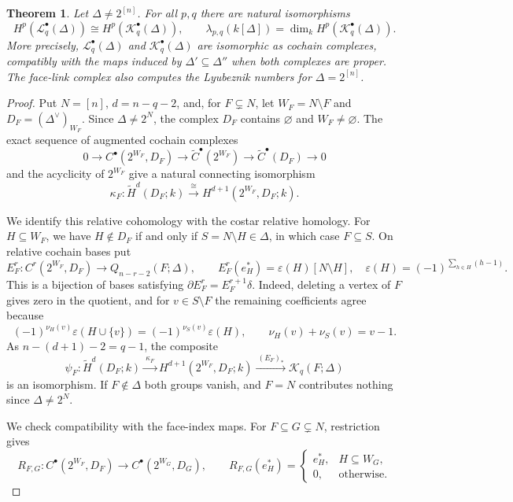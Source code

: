 \documentclass[11pt]{article}
\theoremstyle{plain}
\newtheorem{theorem}{Theorem}[section]
\theoremstyle{definition}
\newcommand{\kk}{k}
\newcommand{\rH}{\widetilde{H}}
\newcommand{\rC}{\widetilde{C}}
\newcommand{\Lc}{\mathcal L}
\newcommand{\Kc}{\mathcal K}
\begin{document}
\begin{theorem}\label{thm:link-model}
Let $\Delta\ne2^{[n]}$. For all $p,q$ there are natural isomorphisms
\[
H^p(\Lc_q^\bullet(\Delta))\cong H^p(\Kc_q^\bullet(\Delta)),\qquad
\lambda_{p,q}(\kk[\Delta])=\dim_\kk H^p(\Kc_q^\bullet(\Delta)).
\]
More precisely, $\Lc_q^\bullet(\Delta)$ and $\Kc_q^\bullet(\Delta)$ are isomorphic as cochain complexes, compatibly with the maps induced by $\Delta'\subseteq\Delta''$ when both complexes are proper. The face-link complex also computes the Lyubeznik numbers for $\Delta=2^{[n]}$.
\end{theorem}

\begin{proof}
Put $N=[n]$, $d=n-q-2$, and, for $F\subsetneq N$, let $W_F=N\setminus F$ and $D_F=(\Delta^\vee)_{W_F}$. Since $\Delta\ne2^N$, the complex $D_F$ contains $\varnothing$ and $W_F\ne\varnothing$. The exact sequence of augmented cochain complexes
\[
0\longrightarrow C^\bullet(2^{W_F},D_F)\longrightarrow\rC^\bullet(2^{W_F})\longrightarrow\rC^\bullet(D_F)\longrightarrow0
\]
and the acyclicity of $2^{W_F}$ give a natural connecting isomorphism
\[
\kappa_F:\rH^d(D_F;\kk)\xrightarrow{\ \cong\ }H^{d+1}(2^{W_F},D_F;\kk).
\]

We identify this relative cohomology with the costar relative homology. For $H\subseteq W_F$, we have $H\notin D_F$ if and only if $S=N\setminus H\in\Delta$, in which case $F\subseteq S$. On relative cochain bases put
\[
E_F^r:C^r(2^{W_F},D_F)\longrightarrow Q_{n-r-2}(F;\Delta),\qquad
E_F^r(e_H^*)=\varepsilon(H)[N\setminus H],\quad
\varepsilon(H)=(-1)^{\sum_{h\in H}(h-1)}.
\]
This is a bijection of bases satisfying $\partial E_F^r=E_F^{r+1}\delta$. Indeed, deleting a vertex of $F$ gives zero in the quotient, and for $v\in S\setminus F$ the remaining coefficients agree because
\[
(-1)^{\nu_H(v)}\varepsilon(H\cup\{v\})=(-1)^{\nu_S(v)}\varepsilon(H),\qquad
\nu_H(v)+\nu_S(v)=v-1.
\]
As $n-(d+1)-2=q-1$, the composite
\[
\psi_F:\rH^d(D_F;\kk)\xrightarrow{\ \kappa_F\ }H^{d+1}(2^{W_F},D_F;\kk)
\xrightarrow{\ (E_F)_*\ }\Kc_q(F;\Delta)
\]
is an isomorphism. If $F\notin\Delta$ both groups vanish, and $F=N$ contributes nothing since $\Delta\ne2^N$.

We check compatibility with the face-index maps. For $F\subseteq G\subsetneq N$, restriction gives
\[
R_{F,G}:C^\bullet(2^{W_F},D_F)\longrightarrow C^\bullet(2^{W_G},D_G),\qquad
R_{F,G}(e_H^*)=\begin{cases}e_H^*,&H\subseteq W_G,\\0,&\text{otherwise}.\end{cases}
\]


\end{proof}
\end{document}

